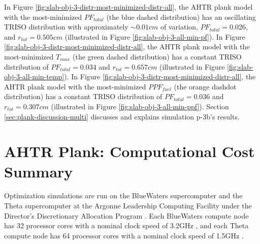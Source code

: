In Figure \ref{fig:slab-obj-3-distr-most-minimized-distr-all}, the \gls{AHTR} plank model 
with the most-minimized $PF_{total}$ (the blue dashed distribution) has an 
oscillating TRISO distribution with approximately $\sim0.01cm$ of variation, 
$PF_{total} = 0.026$, and $r_{tot}=0.505cm$ (illustrated in Figure 
\ref{fig:slab-obj-3-all-min-pf}).
In Figure \ref{fig:slab-obj-3-distr-most-minimized-distr-all}, the \gls{AHTR} plank 
model with the most-minimized $T_{max}$ (the green dashed distribution) has a constant 
TRISO distribution of $PF_{total}=0.034$ and $r_{tot}=0.657cm$
(illustrated in Figure \ref{fig:slab-obj-3-all-min-temp}).
In Figure \ref{fig:slab-obj-3-distr-most-minimized-distr-all}, the \gls{AHTR} plank 
model with the most-minimized $PPF_{fuel}$ (the orange dashdot distribution) has a 
constant TRISO distribution of $PF_{total} = 0.036$ and $r_{tot}=0.307cm$
(illustrated in Figure \ref{fig:slab-obj-3-all-min-ppf}).
Section \ref{sec:plank-discussion-multi} discusses and explains simulation p-3b's 
results.

\section{AHTR Plank: Computational Cost Summary}
\label{sec:plank-compute-cost}
Optimization simulations are run on the BlueWaters supercomputer \cite{ncsa_about_2017} and
the Theta supercomputer at the Argonne Leadership Computing Facility under the Director's 
Discretionary Allocation Program \cite{noauthor_argonne_2022}. 
Each BlueWaters compute node has 32 processor cores with a nominal clock speed of 3.2GHz
\cite{ncsa_about_2017}, and each Theta compute node has 64 processor cores with a nominal 
clock speed of 1.5GHz \cite{noauthor_argonne_2022}.  


